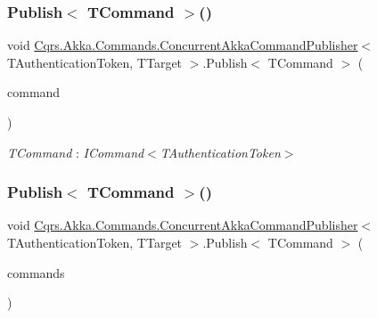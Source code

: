 \subsubsection{\texorpdfstring{Publish$<$ T\+Command $>$()}{Publish< TCommand >()}\hspace{0.1cm}{\footnotesize\ttfamily [1/2]}}
{\footnotesize\ttfamily void \hyperlink{classCqrs_1_1Akka_1_1Commands_1_1ConcurrentAkkaCommandPublisher}{Cqrs.\+Akka.\+Commands.\+Concurrent\+Akka\+Command\+Publisher}$<$ T\+Authentication\+Token, T\+Target $>$.Publish$<$ T\+Command $>$ (\begin{DoxyParamCaption}\item[{T\+Command}]{command }\end{DoxyParamCaption})}

\begin{Desc}
\item[Type Constraints]\begin{description}
\item[{\em T\+Command} : {\em I\+Command$<$T\+Authentication\+Token$>$}]\end{description}
\end{Desc}
\mbox{\label{classCqrs_1_1Akka_1_1Commands_1_1ConcurrentAkkaCommandPublisher_af8c681932cd7586a70cb65db8cbb5bfe_af8c681932cd7586a70cb65db8cbb5bfe}} 
\subsubsection{\texorpdfstring{Publish$<$ T\+Command $>$()}{Publish< TCommand >()}\hspace{0.1cm}{\footnotesize\ttfamily [2/2]}}
{\footnotesize\ttfamily void \hyperlink{classCqrs_1_1Akka_1_1Commands_1_1ConcurrentAkkaCommandPublisher}{Cqrs.\+Akka.\+Commands.\+Concurrent\+Akka\+Command\+Publisher}$<$ T\+Authentication\+Token, T\+Target $>$.Publish$<$ T\+Command $>$ (\begin{DoxyParamCaption}\item[{I\+Enumerable$<$ T\+Command $>$}]{commands }\end{DoxyParamCaption})}

